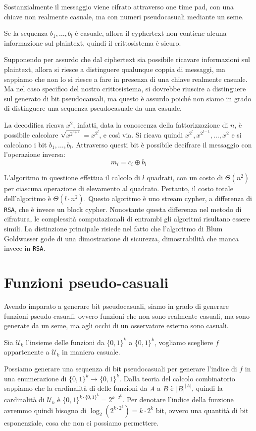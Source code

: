 Sostanzialmente il messaggio viene cifrato attraverso one time pad, 
con una chiave non realmente casuale, ma con numeri pseudocasuali mediante un seme.

Se la sequenza $b_1, \dots, b_l$ è casuale, allora il cyphertext non contiene 
alcuna informazione sul plaintext, quindi il crittosistema è sicuro.

Supponendo per assurdo che dal ciphertext sia possibile ricavare informazioni sul plaintext,
allora si riesce a distinguere qualunque coppia di messaggi, ma sappiamo che non lo si riesce a 
fare in presenza di una chiave realmente casuale. Ma nel caso specifico del nostro crittosistema, 
si dovrebbe riuscire a distinguere sul generato di bit pseudocausali, ma questo è assurdo 
poiché non siamo in grado di distinguere una sequenza pseudocasuale da una casuale.

La decodifica ricava $x^2$, infatti, data la conoscenza della fattorizzazione di $n$, 
è possibile calcolare $\sqrt{x^{2^{l+1}}} = x^{2^l}$, e così via. Si ricava quindi
$x^{2^l}, x^{2^{l-1}}, \dots, x^2$ e si calcolano i bit $b_1, \dots, b_l$. Attraverso 
questi bit è possibile decifrare il messaggio con l'operazione inversa:
\[
  m_i = c_i \oplus b_i
\]

L'algoritmo in questione effettua il calcolo di $l$ quadrati,
con un costo di $\Theta(n^2)$ per ciascuna operazione di elevamento
al quadrato. Pertanto, il costo totale dell'algoritmo è $\Theta(l \cdot n^2)$.
Questo algoritmo è uno stream cypher, a differenza di \texttt{RSA}, che è invece
un block cypher. Nonostante questa differenza nel metodo di cifratura, le complessità
computazionali di entrambi gli algoritmi risultano essere simili. La distinzione principale
risiede nel fatto che l'algoritmo di Blum Goldwasser gode di una dimostrazione di sicurezza,
dimostrabilità che manca invece in \texttt{RSA}.

\section{Funzioni pseudo-casuali}
Avendo imparato a generare bit pseudocasuali, siamo in grado di generare funzioni pseudo-casuali,
ovvero funzioni che non sono realmente casuali, ma sono generate da un seme, ma agli occhi 
di un osservatore esterno sono casuali.

Sia $\mathcal{U}_k$ l'insieme delle funzioni da $\{0,1\}^k$ a $\{0,1\}^k$, 
vogliamo scegliere $f$ appartenente a $\mathcal{U}_k$ in maniera casuale.

Possiamo generare una sequenza di bit pseudocasuali per generare l'indice di $f$ in 
una enumerazione di $\{0,1\}^k \to \{0,1\}^k$. Dalla teoria del calcolo combinatorio sappiamo
che la cardinalità di delle funzioni da $A$ a $B$ è $|B|^{|A|}$, quindi la cardinalità
di $\mathcal{U}_k$ è $\{0,1\}^{k\cdot \{0,1\}^k} = 2^{k\cdot 2^k}$.
Per denotare l'indice della funzione avremmo quindi bisogno di $\log_2(2^{k\cdot 2^k}) = k\cdot 2^k$ bit,
ovvero una quantità di bit esponenziale, cosa che non ci possiamo permettere.

